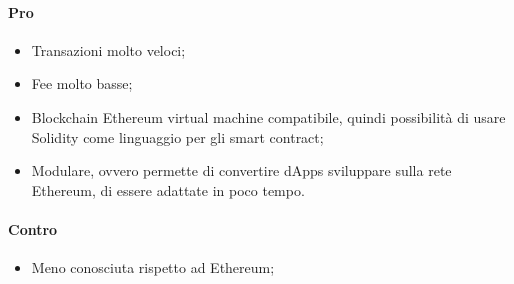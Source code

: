     \paragraph{Pro}
    \begin{itemize}
        \item Transazioni molto veloci;
        \item Fee molto basse;
        \item Blockchain Ethereum virtual machine compatibile, quindi possibilità di usare Solidity come linguaggio per gli smart contract;
        \item Modulare, ovvero permette di convertire dApps sviluppare sulla rete Ethereum, di essere adattate in poco tempo.
    \end{itemize}
    \paragraph{Contro}
    \begin{itemize}
        \item Meno conosciuta rispetto ad Ethereum;
    \end{itemize}